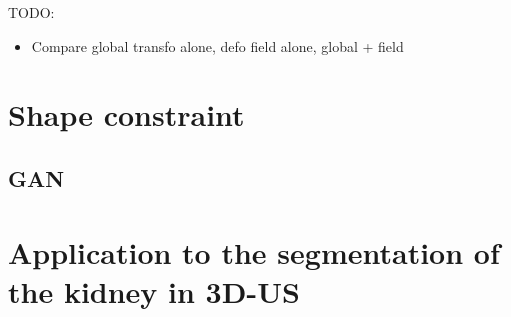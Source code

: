 TODO:
\begin{itemize}
    \item Compare global transfo alone, defo field alone, global + field
\end{itemize}



\section{Shape constraint}

\subsection{GAN}

\section{Application to the segmentation of the kidney in 3D-US}
